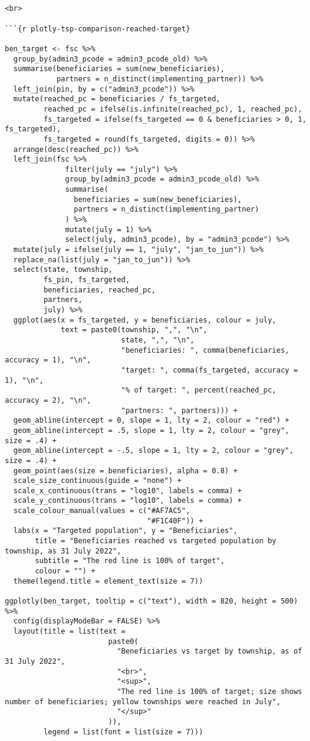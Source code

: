 \documentclass[
]{article}
\begin{document}
\begin{verbatim}


<br>

```{r plotly-tsp-comparison-reached-target}

ben_target <- fsc %>% 
  group_by(admin3_pcode = admin3_pcode_old) %>% 
  summarise(beneficiaries = sum(new_beneficiaries),
            partners = n_distinct(implementing_partner)) %>% 
  left_join(pin, by = c("admin3_pcode")) %>% 
  mutate(reached_pc = beneficiaries / fs_targeted,
         reached_pc = ifelse(is.infinite(reached_pc), 1, reached_pc),
         fs_targeted = ifelse(fs_targeted == 0 & beneficiaries > 0, 1, fs_targeted),
         fs_targeted = round(fs_targeted, digits = 0)) %>% 
  arrange(desc(reached_pc)) %>% 
  left_join(fsc %>%           
              filter(july == "july") %>%
              group_by(admin3_pcode = admin3_pcode_old) %>%
              summarise(
                beneficiaries = sum(new_beneficiaries),
                partners = n_distinct(implementing_partner)
              ) %>%
              mutate(july = 1) %>% 
              select(july, admin3_pcode), by = "admin3_pcode") %>% 
  mutate(july = ifelse(july == 1, "july", "jan_to_jun")) %>% 
  replace_na(list(july = "jan_to_jun")) %>% 
  select(state, township, 
         fs_pin, fs_targeted, 
         beneficiaries, reached_pc, 
         partners, 
         july) %>%
  ggplot(aes(x = fs_targeted, y = beneficiaries, colour = july, 
             text = paste0(township, ",", "\n",
                           state, ",", "\n",
                           "beneficiaries: ", comma(beneficiaries, accuracy = 1), "\n",
                           "target: ", comma(fs_targeted, accuracy = 1), "\n",
                           "% of target: ", percent(reached_pc, accuracy = 2), "\n", 
                           "partners: ", partners))) + 
  geom_abline(intercept = 0, slope = 1, lty = 2, colour = "red") + 
  geom_abline(intercept = .5, slope = 1, lty = 2, colour = "grey", size = .4) + 
  geom_abline(intercept = -.5, slope = 1, lty = 2, colour = "grey", size = .4) + 
  geom_point(aes(size = beneficiaries), alpha = 0.8) +
  scale_size_continuous(guide = "none") + 
  scale_x_continuous(trans = "log10", labels = comma) + 
  scale_y_continuous(trans = "log10", labels = comma) +
  scale_colour_manual(values = c("#AF7AC5", 
                                 "#F1C40F")) + 
  labs(x = "Targeted population", y = "Beneficiaries", 
       title = "Beneficiaries reached vs targeted population by township, as 31 July 2022",
       subtitle = "The red line is 100% of target", 
       colour = "") + 
  theme(legend.title = element_text(size = 7))

ggplotly(ben_target, tooltip = c("text"), width = 820, height = 500) %>% 
  config(displayModeBar = FALSE) %>% 
  layout(title = list(text = 
                        paste0(
                          "Beneficiaries vs target by township, as of 31 July 2022",
                          "<br>",
                          "<sup>",
                          "The red line is 100% of target; size shows number of beneficiaries; yellow townships were reached in July",
                          "</sup>"
                        )),
         legend = list(font = list(size = 7)))
\end{verbatim}
\end{document}
